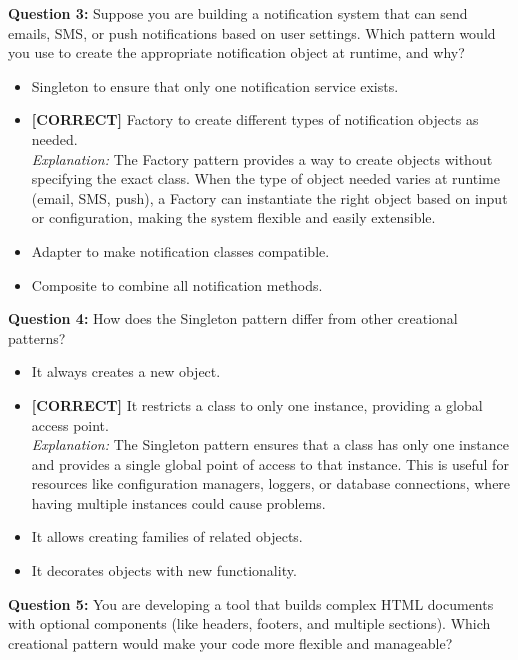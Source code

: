 \vspace{0.3cm}
\noindent
\textbf{Question 3:} Suppose you are building a notification system that can send emails, SMS, or push notifications based on user settings. Which pattern would you use to create the appropriate notification object at runtime, and why?
\\[0.2cm]
\begin{itemize}
 \item Singleton to ensure that only one notification service exists.
 \item \textbf{[CORRECT]} Factory to create different types of notification objects as needed.
\\[0.1cm]
\textit{Explanation:} 
The Factory pattern provides a way to create objects without specifying the exact class. When the type of object needed varies at runtime (email, SMS, push), a Factory can instantiate the right object based on input or configuration, making the system flexible and easily extensible.
 \item Adapter to make notification classes compatible.
 \item Composite to combine all notification methods.
\end{itemize}
\vspace{0.3cm}
\noindent
\textbf{Question 4:} How does the Singleton pattern differ from other creational patterns?
\\[0.2cm]
\begin{itemize}
 \item It always creates a new object.
 \item \textbf{[CORRECT]} It restricts a class to only one instance, providing a global access point.
\\[0.1cm]
\textit{Explanation:} 
The Singleton pattern ensures that a class has only one instance and provides a single global point of access to that instance. This is useful for resources like configuration managers, loggers, or database connections, where having multiple instances could cause problems.
 \item It allows creating families of related objects.
 \item It decorates objects with new functionality.
\end{itemize}
\vspace{0.3cm}
\noindent
\textbf{Question 5:} You are developing a tool that builds complex HTML documents with optional components (like headers, footers, and multiple sections). Which creational pattern would make your code more flexible and manageable?
